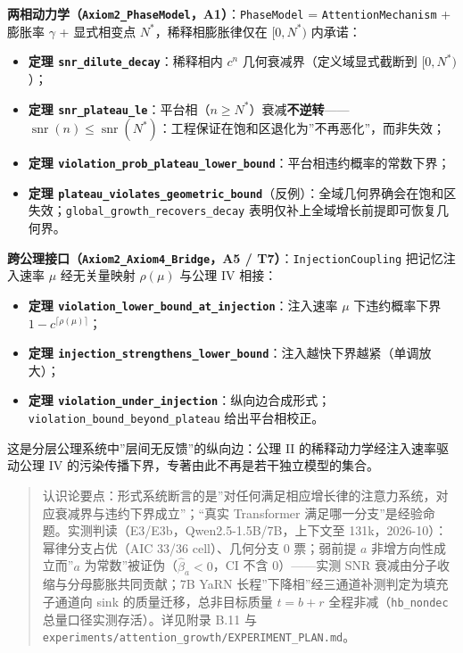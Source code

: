 \textbf{两相动力学（\texttt{Axiom2\_PhaseModel}，A1）}：\texttt{PhaseModel}
= \texttt{AttentionMechanism} + 膨胀率 \(\gamma\) + 显式相变点
\(N^*\)，稀释相膨胀律仅在 \([0,N^*)\) 内承诺：

\begin{itemize}
\tightlist
\item
  \textbf{定理 \texttt{snr\_dilute\_decay}}：稀释相内 \(c^n\)
  几何衰减界（定义域显式截断到 \([0,N^*)\)）；
\item
  \textbf{定理
  \texttt{snr\_plateau\_le}}：平台相（\(n\ge N^*\)）衰减\textbf{不逆转}------\(\operatorname{snr}(n)\le\operatorname{snr}(N^*)\)：工程保证在饱和区退化为''不再恶化''，而非失效；
\item
  \textbf{定理
  \texttt{violation\_prob\_plateau\_lower\_bound}}：平台相违约概率的常数下界；
\item
  \textbf{定理
  \texttt{plateau\_violates\_geometric\_bound}}（反例）：全域几何界确会在饱和区失效；\texttt{global\_growth\_recovers\_decay}
  表明仅补上全域增长前提即可恢复几何界。
\end{itemize}

\textbf{跨公理接口（\texttt{Axiom2\_Axiom4\_Bridge}，A5 /
T7）}：\texttt{InjectionCoupling} 把记忆注入速率 \(\mu\) 经无关量映射
\(\rho(\mu)\) 与公理 IV 相接：

\begin{itemize}
\tightlist
\item
  \textbf{定理
  \texttt{violation\_lower\_bound\_at\_injection}}：注入速率 \(\mu\)
  下违约概率下界 \(1-c^{\lceil\rho(\mu)\rceil}\)；
\item
  \textbf{定理
  \texttt{injection\_strengthens\_lower\_bound}}：注入越快下界越紧（单调放大）；
\item
  \textbf{定理
  \texttt{violation\_under\_injection}}：纵向边合成形式；\texttt{violation\_bound\_beyond\_plateau}
  给出平台相校正。
\end{itemize}

这是分层公理系统中''层间无反馈''的纵向边：公理 II
的稀释动力学经注入速率驱动公理 IV
的污染传播下界，专著由此不再是若干独立模型的集合。

\begin{quote}
认识论要点：形式系统断言的是''对任何满足相应增长律的注意力系统，对应衰减界与违约下界成立''；``真实
Transformer
满足哪一分支''是经验命题。实测判读（E3/E3b，Qwen2.5-1.5B/7B，上下文至
131k，2026-10）：幂律分支占优（AIC 33/36 cell）、几何分支 0 票；弱前提
\(a\) 非增方向性成立而''\(a\) 为常数''被证伪（\(\hat\beta_a<0\)，CI 不含
0）------实测 SNR 衰减由分子收缩与分母膨胀共同贡献；7B YaRN
长程''下降相''经三通道补测判定为填充子通道向 sink
的质量迁移，总非目标质量 \(t=b+r\) 全程非减（\texttt{hb\_nondec}
总量口径实测存活）。详见附录 B.11 与
\texttt{experiments/attention\_growth/EXPERIMENT\_PLAN.md}。
\end{quote}


